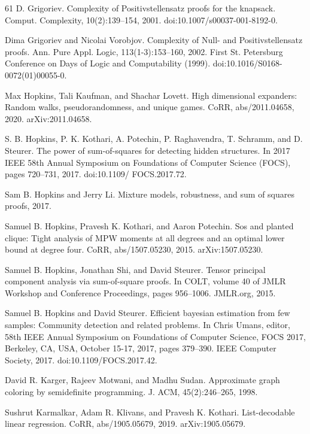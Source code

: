 \documentclass[10pt,a4paper]{article}
\theoremstyle{definition}
\begin{document}
\begin{thebibliography}{61}
D. Grigoriev. Complexity of Positivstellensatz proofs for the knapsack. Comput. Complexity, 10(2):139–154, 2001. doi:10.1007/s00037-001-8192-0.

Dima Grigoriev and Nicolai Vorobjov. Complexity of Null- and Positivstellensatz proofs. Ann. Pure Appl. Logic, 113(1-3):153–160, 2002. First St. Petersburg Conference on Days of Logic and Computability (1999). doi:10.1016/S0168-0072(01)00055-0.

Max Hopkins, Tali Kaufman, and Shachar Lovett. High dimensional expanders: Random walks, pseudorandomness, and unique games. CoRR, abs/2011.04658, 2020. arXiv:2011.04658.

S. B. Hopkins, P. K. Kothari, A. Potechin, P. Raghavendra, T. Schramm, and D. Steurer. The power of sum-of-squares for detecting hidden structures. In 2017 IEEE 58th Annual Symposium on Foundations of Computer Science (FOCS), pages 720–731, 2017. doi:10.1109/ FOCS.2017.72.

Sam B. Hopkins and Jerry Li. Mixture models, robustness, and sum of squares proofs, 2017.

Samuel B. Hopkins, Pravesh K. Kothari, and Aaron Potechin. Sos and planted clique: Tight analysis of MPW moments at all degrees and an optimal lower bound at degree four. CoRR, abs/1507.05230, 2015. arXiv:1507.05230.

Samuel B. Hopkins, Jonathan Shi, and David Steurer. Tensor principal component analysis via sum-of-square proofs. In COLT, volume 40 of JMLR Workshop and Conference Proceedings, pages 956–1006. JMLR.org, 2015.

Samuel B. Hopkins and David Steurer. Efficient bayesian estimation from few samples: Community detection and related problems. In Chris Umans, editor, 58th IEEE Annual Symposium on Foundations of Computer Science, FOCS 2017, Berkeley, CA, USA, October 15-17, 2017, pages 379–390. IEEE Computer Society, 2017. doi:10.1109/FOCS.2017.42.

David R. Karger, Rajeev Motwani, and Madhu Sudan. Approximate graph coloring by semidefinite programming. J. ACM, 45(2):246–265, 1998.

Sushrut Karmalkar, Adam R. Klivans, and Pravesh K. Kothari. List-decodable linear regression. CoRR, abs/1905.05679, 2019. arXiv:1905.05679.


\end{thebibliography}
\end{document}

